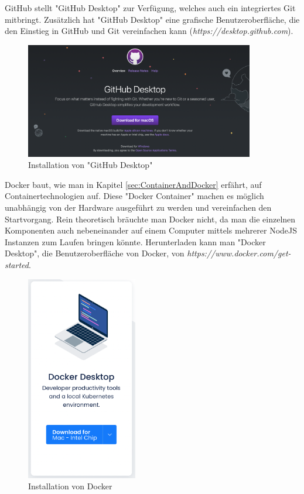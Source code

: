 GitHub stellt "GitHub Desktop" zur Verfügung, welches auch ein integriertes Git mitbringt. Zusätzlich hat "GitHub Desktop" eine grafische  Benutzeroberfläche, die den Einstieg in GitHub und Git vereinfachen kann (\emph{https://desktop.github.com}). 

\begin{figure}[H]
    \centering
    \includegraphics[width=100mm]{media/Handbuch/github_desktop.png}
    \caption{Installation von "GitHub Desktop"}
    \label{fig:githubdesktop}
\end{figure}


Docker baut, wie man in Kapitel \ref{sec:ContainerAndDocker} erfährt, auf Containertechnologien auf. Diese "Docker Container" machen es möglich unabhängig von der Hardware ausgeführt zu werden und vereinfachen den Startvorgang. Rein theoretisch bräuchte man Docker nicht, da man die einzelnen Komponenten auch nebeneinander auf einem Computer mittels mehrerer NodeJS Instanzen zum Laufen bringen könnte. Herunterladen kann man "Docker Desktop", die Benutzeroberfläche von Docker, von \emph{https://www.docker.com/get-started}.

\begin{figure}[H]
    \centering
    \includegraphics[height=90mm]{media/Handbuch/dockerdesktop.png}
    \caption{Installation von Docker}
\end{figure}

